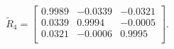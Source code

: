 \begin{equation*}
\widetilde{R}_{4} = 
\begin{bmatrix}
  0.9989 &  -0.0339 &  -0.0321 \\
  0.0339 &   0.9994 &  -0.0005 \\
  0.0321 &  -0.0006 &   0.9995 \\
\end{bmatrix}.
\end{equation*}

